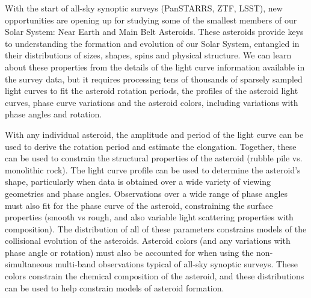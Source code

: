 \documentclass[11pt]{article}
\begin{document}
%
%
%

\sciencejustification
With the start of all-sky synoptic surveys (PanSTARRS, ZTF, LSST), new opportunities
are opening up for studying some of the smallest members of our Solar System: 
Near Earth and Main Belt Asteroids. These asteroids provide keys to understanding
the formation and evolution of our Solar System, entangled in their distributions of
sizes, shapes, spins and physical structure. We can learn about these properties from
the details of the light curve information available in the survey data, but it requires processing
tens of thousands of sparsely sampled light curves to fit the asteroid rotation periods, 
the profiles of the asteroid light curves, phase curve variations and the asteroid colors,
including variations with phase angles and rotation.

With any individual asteroid, the amplitude and period of the light curve can be used
to derive the rotation period and estimate the elongation. Together, these can be used
to constrain the structural properties of the asteroid (rubble pile vs. monolithic rock). 
The light curve profile can be used to determine the 
asteroid's shape, particularly when data is obtained over a wide variety of viewing geometries
and phase angles. Observations over a wide range of phase angles must also fit for the phase curve
of the asteroid, constraining the surface properties (smooth vs rough, and also variable light scattering properties
with composition). The distribution of all of these parameters 
constrains models of the collisional evolution of the asteroids. Asteroid colors (and any variations with 
phase angle or rotation) must also be accounted for when using the non-simultaneous multi-band 
observations typical of all-sky synoptic surveys. These colors constrain the chemical composition of the 
asteroid, and these distributions can be used to help constrain models of asteroid formation. 
\end{document}
